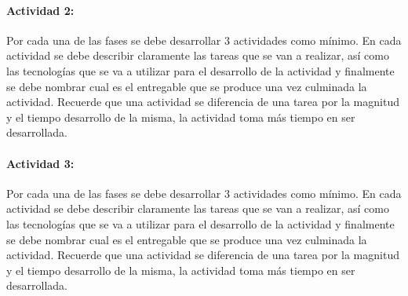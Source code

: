 \paragraph{Actividad 2:} Por cada una de las fases se debe desarrollar 3 actividades como mínimo. En cada actividad se debe describir claramente las tareas que se van a realizar, así como las tecnologías que se va a utilizar para el desarrollo de la actividad y finalmente se debe nombrar cual es el entregable que se produce una vez culminada la actividad. Recuerde que una actividad se diferencia de una tarea por la magnitud y el tiempo desarrollo de la misma, la actividad toma más tiempo en ser desarrollada.

\paragraph{Actividad 3:} Por cada una de las fases se debe desarrollar 3 actividades como mínimo. En cada actividad se debe describir claramente las tareas que se van a realizar, así como las tecnologías que se va a utilizar para el desarrollo de la actividad y finalmente se debe nombrar cual es el entregable que se produce una vez culminada la actividad. Recuerde que una actividad se diferencia de una tarea por la magnitud y el tiempo desarrollo de la misma, la actividad toma más tiempo en ser desarrollada.


